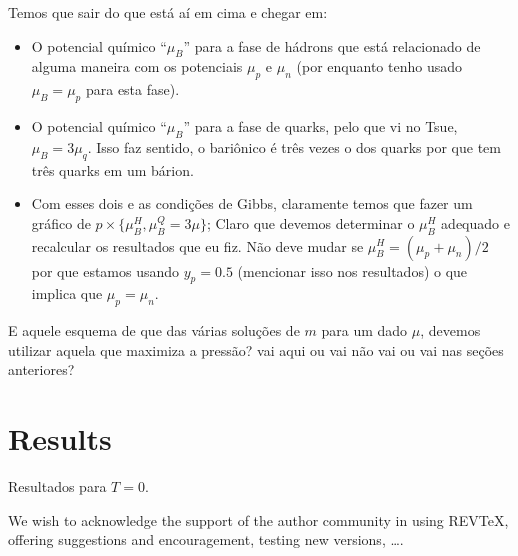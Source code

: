 \documentclass[prc, reprint, amsmath, linenumbers,10pt]{revtex4-1}
\begin{document}
Temos que sair do que está aí em cima e chegar em:
\begin{itemize}
	\item O potencial químico ``$\mu_B$'' para a fase de hádrons que está relacionado de alguma maneira com os potenciais $\mu_p$ e $\mu_n$ (por enquanto tenho usado $\mu_B = \mu_p$ para esta fase).
	\item O potencial químico ``$\mu_B$'' para a fase de quarks, pelo que vi no Tsue, $\mu_B = 3 \mu_q$. Isso faz sentido, o bariônico é três vezes o dos quarks por que tem três quarks em um bárion. 
	\item Com esses dois e as condições de Gibbs, claramente temos que fazer um gráfico de $p \times \{\mu_B^H, \mu_B^Q = 3 \mu\}$; Claro que devemos determinar o $\mu_B^H$ adequado e recalcular os resultados que eu fiz. Não deve mudar se $\mu_B^H = (\mu_p + \mu_n)/2$ por que estamos usando $y_p = 0.5$ (mencionar isso nos resultados) o que implica que $\mu_p = \mu_n$. 
\end{itemize}

E aquele esquema de que das várias soluções de $m$ para um dado $\mu$, devemos utilizar aquela que maximiza  a pressão? vai aqui ou vai não vai ou vai nas seções anteriores?

\section{Results}

Resultados para $T = 0$.


%
%

\begin{acknowledgments}
We wish to acknowledge the support of the author community in using
REV\TeX{}, offering suggestions and encouragement, testing new versions,
\dots.
\end{acknowledgments}






\end{document}
